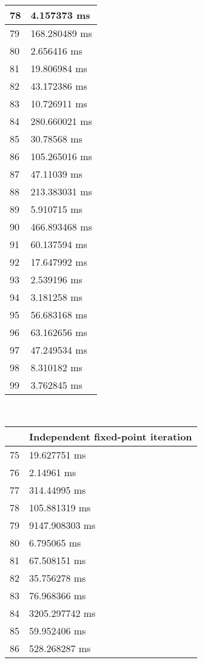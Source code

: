 \begin{multicols}{2}
\begin{tabular}{|l|l|}
		78 & 4.157373 ms \\ \hline
		79 & 168.280489 ms \\ \hline
		80 & 2.656416 ms \\ \hline
		81 & 19.806984 ms \\ \hline
		82 & 43.172386 ms \\ \hline
		83 & 10.726911 ms \\ \hline
		84 & 280.660021 ms \\ \hline
		85 & 30.78568 ms \\ \hline
		86 & 105.265016 ms \\ \hline
		87 & 47.11039 ms \\ \hline
		88 & 213.383031 ms \\ \hline
		89 & 5.910715 ms \\ \hline
		90 & 466.893468 ms \\ \hline
		91 & 60.137594 ms \\ \hline
		92 & 17.647992 ms \\ \hline
		93 & 2.539196 ms \\ \hline
		94 & 3.181258 ms \\ \hline
		95 & 56.683168 ms \\ \hline
		96 & 63.162656 ms \\ \hline
		97 & 47.249534 ms \\ \hline
		98 & 8.310182 ms \\ \hline
		99 & 3.762845 ms \\ \hline
	\end{tabular}\\
	\begin{tabular}{|l|l|}
		\hline
		& Independent fixed-point iteration \\ \hline
		75 & 19.627751 ms \\ \hline
		76 & 2.14961 ms \\ \hline
		77 & 314.44995 ms \\ \hline
		78 & 105.881319 ms \\ \hline
		79 & 9147.908303 ms \\ \hline
		80 & 6.795065 ms \\ \hline
		81 & 67.508151 ms \\ \hline
		82 & 35.756278 ms \\ \hline
		83 & 76.968366 ms \\ \hline
		84 & 3205.297742 ms \\ \hline
		85 & 59.952406 ms \\ \hline
		86 & 528.268287 ms \\ \hline

\end{tabular}
\end{multicols}
